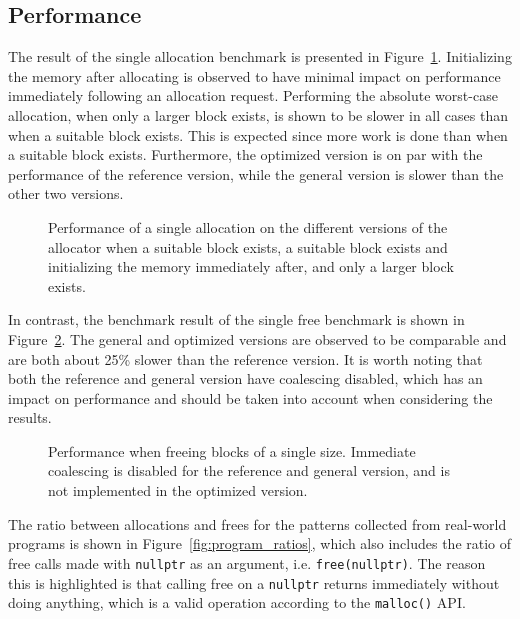 
\subsection{Performance}
\label{sec:results:performance}

The result of the single allocation benchmark is presented in Figure~\ref{fig:allocation_performance}. Initializing the memory after allocating is observed to have minimal impact on performance immediately following an allocation request. Performing the absolute worst-case allocation, when only a larger block exists, is shown to be slower in all cases than when a suitable block exists. This is expected since more work is done than when a suitable block exists. Furthermore, the optimized version is on par with the performance of the reference version, while the general version is slower than the other two versions. 

\begin{figure}[]
    \centering
    
    \caption{Performance of a single allocation on the different versions of the allocator when a suitable block exists, a suitable block exists and initializing the memory immediately after, and only a larger block exists.}
    \label{fig:allocation_performance}
\end{figure}

In contrast, the benchmark result of the single free benchmark is shown in Figure~\ref{fig:free_performance}. The general and optimized versions are observed to be comparable and are both about 25\% slower than the reference version. It is worth noting that both the reference and general version have coalescing disabled, which has an impact on performance and should be taken into account when considering the results.

\begin{figure}[]
    \centering
    
    \caption{Performance when freeing blocks of a single size. Immediate coalescing is disabled for the reference and general version, and is not implemented in the optimized version.}
    \label{fig:free_performance}
\end{figure}

The ratio between allocations and frees for the patterns collected from real-world programs is shown in Figure~\ref{fig:program_ratios}, which also includes the ratio of free calls made with \texttt{nullptr} as an argument, i.e. \texttt{free(nullptr)}. The reason this is highlighted is that calling free on a \texttt{nullptr} returns immediately without doing anything, which is a valid operation according to the \texttt{malloc()} API.

